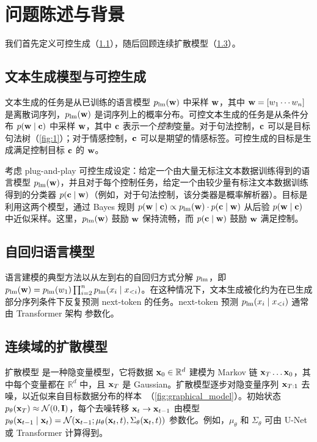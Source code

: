 
\newcommand{\xxtheta}{f_\theta} 
\section{问题陈述与背景}
\label{sec:background}

我们首先定义可控生成（\cref{ssec:control_setup}），随后回顾连续扩散模型（\cref{ssec:diffusion_setup}）。

\subsection{文本生成模型与可控生成} 
\label{ssec:control_setup}
文本生成的任务是从已训练的语言模型 $p_\text{lm} (\mathbf{w})$ 中采样 $\mathbf{w}$，其中 $\mathbf{w} = [w_1 \cdots w_n]$ 是离散词序列，$p_\text{lm} (\mathbf{w})$ 是词序列上的概率分布。可控文本生成的任务是从条件分布 $p(\mathbf{w} \mid \mathbf{c})$ 中采样 $\mathbf{w}$，其中 $\mathbf{c}$ 表示一个\emph{控制}变量。对于句法控制，$\mathbf{c}$ 可以是目标句法树（\cref{fig:1}）；对于情感控制，$\mathbf{c}$ 可以是期望的情感标签。可控生成的目标是生成满足控制目标 $\mathbf{c}$ 的 $\mathbf{w}$。

考虑 plug-and-play 可控生成设定：给定一个由大量无标注文本数据训练得到的语言模型 $p_\text{lm}(\mathbf{w})$，并且对于每个控制任务，给定一个由较少量有标注文本数据训练得到的分类器 $p(\mathbf{c} \mid \mathbf{w})$（例如，对于句法控制，该分类器是概率解析器）。目标是利用这两个模型，通过 Bayes 规则 $p(\mathbf{w} \mid \mathbf{c}) \propto p_\text{lm}(\mathbf{w}) \cdot p(\mathbf{c} \mid \mathbf{w})$ 从后验 $p(\mathbf{w} \mid \mathbf{c})$ 中近似采样。这里，$p_\text{lm}(\mathbf{w})$ 鼓励 $\mathbf{w}$ 保持流畅，而 $p(\mathbf{c} \mid \mathbf{w})$ 鼓励 $\mathbf{w}$ 满足控制。






\subsection{自回归语言模型}
语言建模的典型方法以从左到右的自回归方式分解 $p_\text{lm}$，即 $p_\text{lm}(\mathbf{w}) = p_\text{lm}(w_1) \prod_{i=2}^n p_\text{lm}(x_i \mid x_{<i})$。在这种情况下，文本生成被化约为在已生成部分序列条件下反复预测 next-token 的任务。next-token 预测 $p_\text{lm}(x_i \mid x_{<i})$ 通常由 Transformer 架构 \cite{Vaswani2017Attn} 参数化。

\subsection{连续域的扩散模型}
\label{ssec:diffusion_setup}

扩散模型 \citep{ho2020denoising,nichol2021improved} 是一种隐变量模型，它将数据 $\mathbf{x}_{0} \in \mathbb{R}^d$ 建模为 Markov 链 $\mathbf{x}_{T} \dots \mathbf{x}_{0}$，其中每个变量都在 $\mathbb{R}^d$ 中，且 $\mathbf{x}_{T}$ 是 Gaussian。扩散模型逐步对隐变量序列 $\mathbf{x}_{T:1}$ 去噪，以近似来自目标数据分布的样本~（\cref{fig:graphical_model}）。初始状态 $p_\theta(\mathbf{x}_{T}) \approx \mathcal{N} (0, \mathbf{I})$，每个去噪转移 $\mathbf{x}_{t} \rightarrow \mathbf{x}_{t-1}$ 由模型 $p_\theta(\mathbf{x}_{t-1}\mid \mathbf{x}_{t}) = \mathcal{N}(\mathbf{x}_{t-1}; \mu_\theta(\mathbf{x}_{t}, t), \Sigma_\theta(\mathbf{x}_{t}, t))$ 参数化。例如，$\mu_\theta$ 和 $\Sigma_\theta$ 可由 U-Net 或 Transformer 计算得到。


